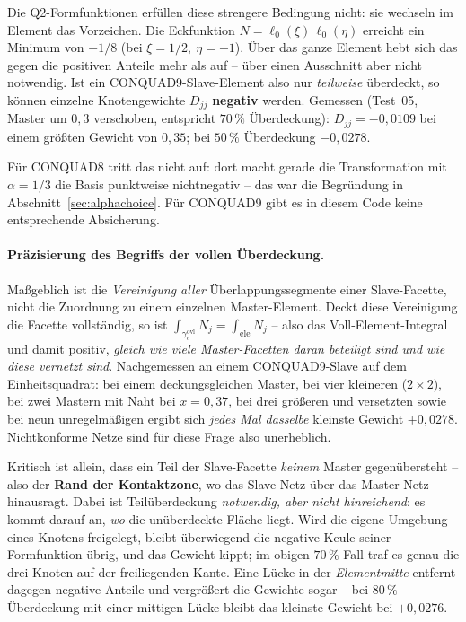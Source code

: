 \documentclass[a4paper,11pt]{article}
\def\tfrac#1#2{#1/#2}%
\def\tilde#1{#1}%
\begin{document}
Die Q2-Formfunktionen erfüllen diese strengere Bedingung nicht: sie wechseln im Element das
Vorzeichen. Die Eckfunktion $N=\ell_0(\xi)\,\ell_0(\eta)$ erreicht ein Minimum von $-\tfrac18$
(bei $\xi=\tfrac12,\ \eta=-1$). Über das ganze Element hebt sich das gegen die positiven Anteile
mehr als auf -- über einen Ausschnitt aber nicht notwendig. Ist ein CONQUAD9-Slave-Element also nur
\emph{teilweise} überdeckt, so können einzelne Knotengewichte $\tilde D_{jj}$ \textbf{negativ}
werden. Gemessen (Test~05, Master um $0{,}3$ verschoben, entspricht $70\,\%$ Überdeckung):
$\tilde D_{jj}=-0{,}0109$ bei einem größten Gewicht von $0{,}35$; bei $50\,\%$ Überdeckung
$-0{,}0278$.

Für CONQUAD8 tritt das nicht auf: dort macht gerade die Transformation mit $\alpha=\tfrac13$ die
Basis punktweise nichtnegativ -- das war die Begründung in Abschnitt~\ref{sec:alphachoice}. Für
CONQUAD9 gibt es in diesem Code keine entsprechende Absicherung.

\paragraph{Präzisierung des Begriffs der vollen Überdeckung.} Maßgeblich ist die \emph{Vereinigung aller}
Überlappungssegmente einer Slave-Facette, nicht die Zuordnung zu einem einzelnen Master-Element.
Deckt diese Vereinigung die Facette vollständig, so ist $\int_{\gamma_c^{\text{ovl}}}\tilde N_j
= \int_{\text{ele}}\tilde N_j$ -- also das Voll-Element-Integral und damit positiv, \emph{gleich
wie viele Master-Facetten daran beteiligt sind und wie diese vernetzt sind}. Nachgemessen an einem
CONQUAD9-Slave auf dem Einheitsquadrat: bei einem deckungsgleichen Master, bei vier kleineren
($2\times2$), bei zwei Mastern mit Naht bei $x=0{,}37$, bei drei größeren und versetzten sowie bei
neun unregelmäßigen ergibt sich \emph{jedes Mal dasselbe} kleinste Gewicht $+0{,}0278$.
Nichtkonforme Netze sind für diese Frage also unerheblich.

Kritisch ist allein, dass ein Teil der Slave-Facette \emph{keinem} Master gegenübersteht -- also der
\textbf{Rand der Kontaktzone}, wo das Slave-Netz über das Master-Netz hinausragt. Dabei ist
Teilüberdeckung \emph{notwendig, aber nicht hinreichend}: es kommt darauf an, \emph{wo} die
unüberdeckte Fläche liegt. Wird die eigene Umgebung eines Knotens freigelegt, bleibt überwiegend die
negative Keule seiner Formfunktion übrig, und das Gewicht kippt; im obigen $70\,\%$-Fall traf es
genau die drei Knoten auf der freiliegenden Kante. Eine Lücke in der \emph{Elementmitte} entfernt
dagegen negative Anteile und vergrößert die Gewichte sogar -- bei $80\,\%$ Überdeckung mit einer
mittigen Lücke bleibt das kleinste Gewicht bei $+0{,}0276$.
\end{document}
